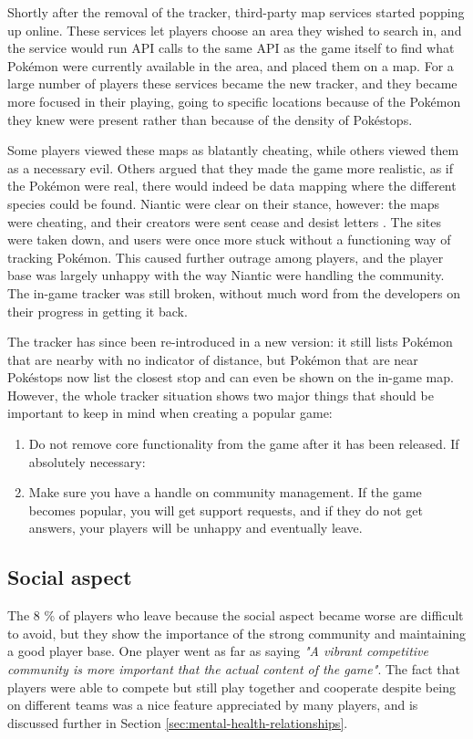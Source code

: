 Shortly after the removal of the tracker, third-party map services started popping up online. These services let players choose an area they wished to search in, and the service would run API calls to the same API as the game itself to find what Pokémon were currently available in the area, and placed them on a map. For a large number of players these services became the new tracker, and they became more focused in their playing, going to specific locations because of the Pokémon they knew were present rather than because of the density of Pokéstops.

Some players viewed these maps as blatantly cheating, while others viewed them as a necessary evil. Others argued that they made the game more realistic, as if the Pokémon were real, there would indeed be data mapping where the different species could be found. Niantic were clear on their stance, however: the maps were cheating, and their creators were sent cease and desist letters \cite{kotakuPokevision}. The sites were taken down, and users were once more stuck without a functioning way of tracking Pokémon. This caused further outrage among players, and the player base was largely unhappy with the way Niantic were handling the community. The in-game tracker was still broken, without much word from the developers on their progress in getting it back.

The tracker has since been re-introduced in a new version: it still lists Pokémon that are nearby with no indicator of distance, but Pokémon that are near Pokéstops now list the closest stop and can even be shown on the in-game map. However, the whole tracker situation shows two major things that should be important to keep in mind when creating a popular game:

\begin{enumerate}
	\item Do not remove core functionality from the game after it has been released. If absolutely necessary:
	\item Make sure you have a handle on community management. If the game becomes popular, you will get support requests, and if they do not get answers, your players will be unhappy and eventually leave.
\end{enumerate}

\subsection{Social aspect}
\label{sec:success-factors-social}
The 8 \% of players who leave because the social aspect became worse are difficult to avoid, but they show the importance of the strong community and maintaining a good player base. One player went as far as saying \emph{"A vibrant competitive community is more important that the actual content of the game"}. The fact that players were able to compete but still play together and cooperate despite being on different teams was a nice feature appreciated by many players, and is discussed further in Section \ref{sec:mental-health-relationships}.

